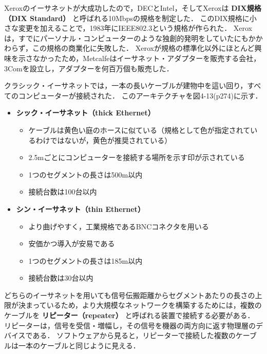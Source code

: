 \documentclass[a4paper]{ltjsarticle}
\providecommand{\tightlist}{%
  \setlength{\itemsep}{0pt}\setlength{\parskip}{0pt}}
\begin{document}
Xeroxのイーサネットが大成功したので，DECとIntel，そしてXeroxは
\textbf{DIX規格（DIX Standard）} と呼ばれる10Mbpsの規格を制定した．
このDIX規格に小さな変更を加えることで，1983年にIEEE802.3という規格が作られた．
Xeroxは，すでにパーソナル・コンピューターのような独創的発明をしていたにもかかわらず，この規格の商業化に失敗した．
Xeroxが規格の標準化以外にほとんど興味を示さなかったため，Metcalfeはイーサネット・アダプターを販売する会社，3Comを設立し，アダプターを何百万個も販売した．

クラシック・イーサネットでは，一本の長いケーブルが建物中を這い回り，すべてのコンピューターが接続された．
このアーキテクチャを図4-13(p274)に示す．

\begin{itemize}
\tightlist
\item
  \textbf{シック・イーサネット（thick Ethernet）}

  \begin{itemize}
  \tightlist
  \item
    ケーブルは黄色い庭のホースに似ている（規格として色が指定されているわけではないが，黄色が推奨されている）
  \item
    2.5mごとにコンピューターを接続する場所を示す印が示されている
  \item
    1つのセグメントの長さは500m以内
  \item
    接続台数は100台以内
  \end{itemize}
\item
  \textbf{シン・イーサネット（thin Ethernet）}

  \begin{itemize}
  \tightlist
  \item
    より曲げやすく，工業規格であるBNCコネクタを用いる
  \item
    安価かつ導入が安易である
  \item
    1つのセグメントの長さは185m以内
  \item
    接続台数は30台以内
  \end{itemize}
\end{itemize}

どちらのイーサネットを用いても信号伝搬距離からセグメントあたりの長さの上限が決まっているため，より大規模なネットワークを構築するためには，複数のケーブルを
\textbf{リピーター（repeater）} と呼ばれる装置で接続する必要がある．
リピーターは，信号を受信・増幅し，その信号を機器の両方向に返す物理層のデバイスである．
ソフトウェアから見ると，リピーターで接続した複数のケーブルは一本のケーブルと同じように見える．
\end{document}
